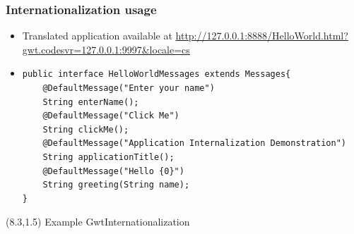 \documentclass[10pt,table, xcolor=pdflatex]{beamer}
\begin{document}
\begin{frame}[fragile]\frametitle{Internationalization usage}
	\begin{itemize}
		\item Translated application available at \url{http://127.0.0.1:8888/HelloWorld.html?gwt.codesvr=127.0.0.1:9997&locale=cs}
        \medskip
        \item[]
        	\lstset{language=Java, basicstyle=\footnotesize\ttfamily}
            \begin{lstlisting}
public interface HelloWorldMessages extends Messages{
    @DefaultMessage("Enter your name")
    String enterName();
    @DefaultMessage("Click Me")
    String clickMe();
    @DefaultMessage("Application Internalization Demonstration")
    String applicationTitle();
    @DefaultMessage("Hello {0}")
    String greeting(String name);
}
            \end{lstlisting}
	\end{itemize}
\begin{textblock}{15}(8.3,1.5)
    {\footnotesize Example GwtInternationalization}
\end{textblock}
\end{frame}
\end{document}
